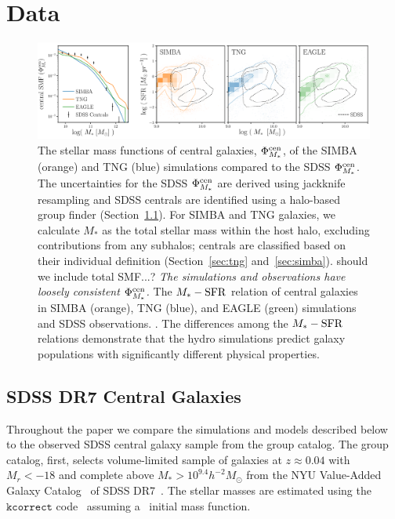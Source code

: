 \section{Data}\label{sec:sims}
\begin{figure}
\begin{center}
    \includegraphics[width=\textwidth]{figs/smf_m_sfr.pdf}
    \caption{\label{fig:smf_msfr}
    The stellar mass functions of central galaxies, $\Phi^{\rm
    cen}_{M_*}$, of the SIMBA (orange) and TNG (blue) simulations compared to
    the SDSS $\Phi^{\rm cen}_{M_*}$. The uncertainties for the SDSS $\Phi^{\rm
    cen}_{M_*}$ are derived using jackknife resampling and SDSS centrals are
    identified using a halo-based group finder (Section~\ref{sec:obs}). For
    SIMBA and TNG galaxies, we calculate $M_*$ as the total stellar mass within
    the host halo, excluding contributions from any subhalos; centrals are
    classified based on their individual definition (Section~\ref{sec:tng}
    and~\ref{sec:simba}). {\color{red} should we include total SMF...?} 
    {\em The simulations and observations have loosely consistent $\Phi^{\rm
    cen}_{M_*}$.
    } 
    The $M_*-{\rm SFR}$ relation of central galaxies in SIMBA (orange), TNG (blue),
    and EAGLE (green) simulations and SDSS observations. . 
    The differences among the $M_*-{\rm SFR}$ relations demonstrate that the hydro
    simulations predict galaxy populations with significantly different
    physical properties. 
    }
\end{center}
\end{figure}

\subsection{SDSS DR7 Central Galaxies} \label{sec:obs} 
Throughout the paper we compare the simulations and models described below
to the observed SDSS central galaxy sample from the \cite{tinker2011} group
catalog. The group catalog, first, selects volume-limited sample of galaxies at
$z \approx 0.04$ with $M_r < -18$ and complete above $M_* > 10^{9.4}
h^{-2}M_\odot$ from the NYU Value-Added Galaxy
Catalog~\citep[VAGC;][]{blanton2005} of SDSS DR7~\citep{abazajian2009}. The
stellar masses are estimated using the $\mathtt{kcorrect}$
code~\citep{blanton2007a} assuming a~\cite{chabrier2003} initial mass
function. 

